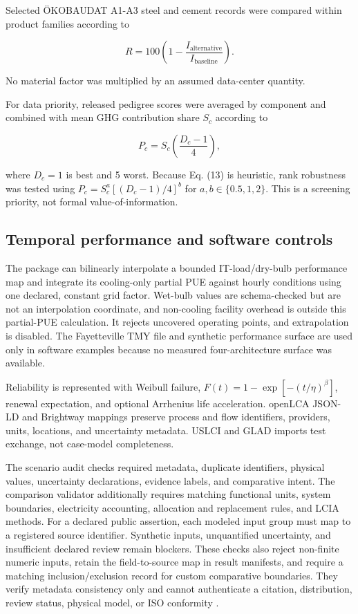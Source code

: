 \documentclass[review,12pt]{elsarticle}
\begin{document}
Selected ÖKOBAUDAT A1-A3 steel and cement records were compared within product families according to

\[
R=100\left(1-\frac{I_\mathrm{alternative}}
{I_\mathrm{baseline}}\right).
\tag{12}
\]

No material factor was multiplied by an assumed data-center quantity.

For data priority, released pedigree scores were averaged by component and combined with mean GHG contribution share $S_c$ according to

\[
P_c=S_c\left(\frac{D_c-1}{4}\right),
\tag{13}
\]

where $D_c=1$ is best and 5 worst. Because Eq. (13) is heuristic, rank robustness was tested using $P_c=S_c^a[(D_c-1)/4]^b$ for $a,b\in\{0.5,1,2\}$. This is a screening priority, not formal value-of-information.

\subsection{Temporal performance and software controls}
The package can bilinearly interpolate a bounded IT-load/dry-bulb performance map and integrate its cooling-only partial PUE against hourly conditions using one declared, constant grid factor. Wet-bulb values are schema-checked but are not an interpolation coordinate, and non-cooling facility overhead is outside this partial-PUE calculation. It rejects uncovered operating points, and extrapolation is disabled. The Fayetteville TMY file and synthetic performance surface are used only in software examples because no measured four-architecture surface was available.

Reliability is represented with Weibull failure, $F(t)=1-\exp[-(t/\eta)^\beta]$, renewal expectation, and optional Arrhenius life acceleration. openLCA JSON-LD and Brightway mappings preserve process and flow identifiers, providers, units, locations, and uncertainty metadata. USLCI and GLAD imports test exchange, not case-model completeness.

The scenario audit checks required metadata, duplicate identifiers, physical values, uncertainty declarations, evidence labels, and comparative intent. The comparison validator additionally requires matching functional units, system boundaries, electricity accounting, allocation and replacement rules, and LCIA methods. For a declared public assertion, each modeled input group must map to a registered source identifier. Synthetic inputs, unquantified uncertainty, and insufficient declared review remain blockers. These checks also reject non-finite numeric inputs, retain the field-to-source map in result manifests, and require a matching inclusion/exclusion record for custom comparative boundaries. They verify metadata consistency only and cannot authenticate a citation, distribution, review status, physical model, or ISO conformity \cite{ref35,ref36}.
\end{document}
